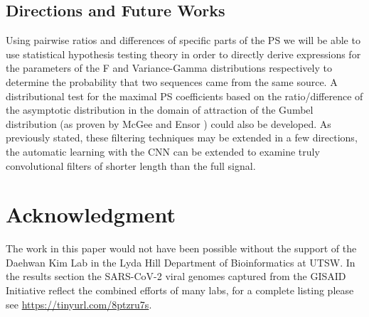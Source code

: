 \documentclass[12pt,conference]{IEEEtran}
\begin{document}
\label{sec:conc}

\subsection{Directions and Future Works} 

Using pairwise ratios and differences of specific parts of the PS we will be able to use statistical hypothesis testing theory in order to directly derive expressions for the parameters of the F and Variance-Gamma distributions respectively to determine the probability that two sequences came from the same 
source.  A distributional test for the maximal PS coefficients based on the ratio/difference of the asymptotic 
distribution in the domain of attraction of the Gumbel distribution (as proven by McGee and Ensor \cite{mcg98}) could also be developed. 
As previously stated, these filtering techniques may be extended in a few directions, the automatic learning with the CNN 
can be extended to examine truly convolutional filters of shorter length than the full signal. 


\appendices
\vspace{-1 em}
\section*{Acknowledgment}
{\small
The work in this paper would not have been possible without the support of the Daehwan Kim Lab in 
the Lyda Hill Department of Bioinformatics at UTSW.  In the results section the SARS-CoV-2 viral 
genomes captured from the GISAID Initiative \cite{gisaid} reflect the combined efforts of many labs, 
for a complete listing please see \url{https://tinyurl.com/8ptzru7s}.
}



\end{document}
